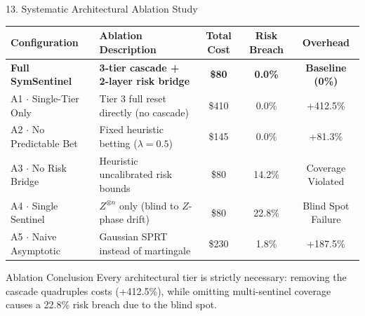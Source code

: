 \documentclass[aspectratio=169, 10pt]{beamer}
\begin{document}
\begin{frame}{13. Systematic Architectural Ablation Study}
    \begin{table}
        \footnotesize
        \centering
        \begin{tabular}{llccc}
            \toprule
            \textbf{Configuration} & \textbf{Ablation Description} & \textbf{Total Cost} & \textbf{Risk Breach} & \textbf{Overhead} \\
            \midrule
            \textbf{Full SymSentinel} & \textbf{3-tier cascade + 2-layer risk bridge} & \textbf{\$80} & \textbf{0.0\%} & \textbf{Baseline (0\%)} \\
            A1 $\cdot$ Single-Tier Only & Tier 3 full reset directly (no cascade) & \$410 & 0.0\% & +412.5\% \\
            A2 $\cdot$ No Predictable Bet & Fixed heuristic betting ($\lambda=0.5$) & \$145 & 0.0\% & +81.3\% \\
            A3 $\cdot$ No Risk Bridge & Heuristic uncalibrated risk bounds & \$80 & \alert{14.2\%} & \alert{Coverage Violated} \\
            A4 $\cdot$ Single Sentinel & $Z^{\otimes n}$ only (blind to $Z$-phase drift) & \$80 & \alert{22.8\%} & \alert{Blind Spot Failure} \\
            A5 $\cdot$ Naive Asymptotic & Gaussian SPRT instead of martingale & \$230 & 1.8\% & +187.5\% \\
            \bottomrule
        \end{tabular}
    \end{table}
    \vspace{0.2cm}
    \begin{block}{Ablation Conclusion}
        Every architectural tier is strictly necessary: removing the cascade quadruples costs (+412.5\%), while omitting multi-sentinel coverage causes a 22.8\% risk breach due to the blind spot.
    \end{block}
\end{frame}
\end{document}
